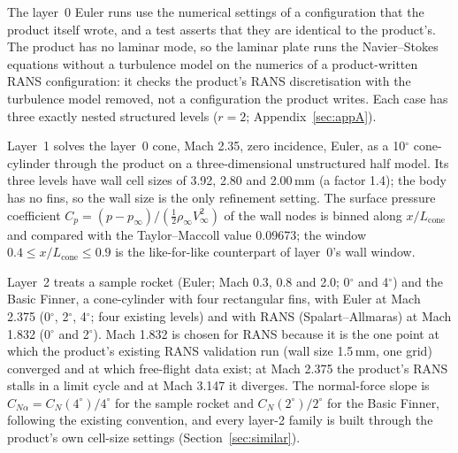 \documentclass[twocolumn]{labreport}
\newcommand{\Cp}{C_p}
\newcommand{\CNa}{C_{N\alpha}}
\newcommand{\pinf}{p_\infty}
\begin{document}
The layer~0 Euler runs use the numerical settings of a configuration that the product itself wrote, and a test asserts that they are identical to the product's.
The product has no laminar mode, so the laminar plate runs the Navier--Stokes equations without a turbulence model on the numerics of a product-written RANS configuration: it checks the product's RANS discretisation with the turbulence model removed, not a configuration the product writes.
Each case has three exactly nested structured levels ($r=2$; Appendix~\ref{sec:appA}).

Layer~1 solves the layer~0 cone, Mach 2.35, zero incidence, Euler, as a 10$^\circ$ cone-cylinder through the product on a three-dimensional unstructured half model.
Its three levels have wall cell sizes of 3.92, 2.80 and 2.00\,mm (a factor 1.4); the body has no fins, so the wall size is the only refinement setting.
The surface pressure coefficient $\Cp=(p-\pinf)/(\tfrac12\rho_\infty V_\infty^2)$ of the wall nodes is binned along $x/L_\mathrm{cone}$ and compared with the Taylor--Maccoll value 0.09673; the window $0.4\le x/L_\mathrm{cone}\le0.9$ is the like-for-like counterpart of layer~0's wall window.

Layer~2 treats a sample rocket (Euler; Mach 0.3, 0.8 and 2.0; 0$^\circ$ and 4$^\circ$) and the Basic Finner, a cone-cylinder with four rectangular fins, with Euler at Mach 2.375 (0$^\circ$, 2$^\circ$, 4$^\circ$; four existing levels) and with RANS (Spalart--Allmaras) at Mach 1.832 (0$^\circ$ and 2$^\circ$).
Mach 1.832 is chosen for RANS because it is the one point at which the product's existing RANS validation run (wall size 1.5\,mm, one grid) converged and at which free-flight data exist; at Mach 2.375 the product's RANS stalls in a limit cycle and at Mach 3.147 it diverges.
The normal-force slope is $\CNa=C_N(4^\circ)/4^\circ$ for the sample rocket and $C_N(2^\circ)/2^\circ$ for the Basic Finner, following the existing convention, and every layer-2 family is built through the product's own cell-size settings (Section~\ref{sec:similar}).
\end{document}
